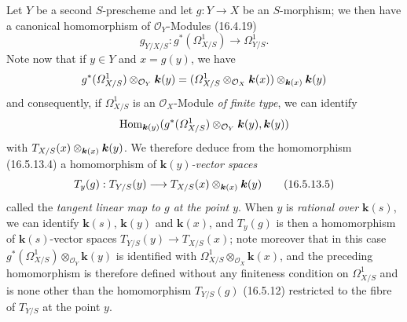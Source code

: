 \begin{env}[16.5.13]
Let $Y$ be a second $S$-prescheme and let $g:Y\to X$ be an $S$-morphism; we
then have a canonical homomorphism of $\mathcal{O}_Y$-Modules (16.4.19)
\[
  g_{Y/X/S}:g^*(\varOmega_{X/S}^1)\longrightarrow\varOmega_{Y/S}^1.
  \tag{16.5.13.4}
  \label{IV.16.5.13.4}
\]
Note now that if $y\in Y$ and $x=g(y)$, we have
\[
  g^*(\varOmega_{X/S}^1)\otimes_{\mathcal{O}_Y}\boldsymbol{k}(y)
  =(\varOmega_{X/S}^1\otimes_{\mathcal{O}_X}\boldsymbol{k}(x))
  \otimes_{\boldsymbol{k}(x)}\boldsymbol{k}(y)
\]
and consequently, if $\varOmega_{X/S}^1$ is an $\mathcal{O}_X$-Module
\emph{of finite type}, we can identify
\[
  \operatorname{Hom}_{\boldsymbol{k}(y)}
  (g^*(\varOmega_{X/S}^1)\otimes_{\mathcal{O}_Y}\boldsymbol{k}(y),\boldsymbol{k}(y))
\]
with $T_{X/S}(x)\otimes_{\boldsymbol{k}(x)}\boldsymbol{k}(y)$. We therefore deduce from the homomorphism
(16.5.13.4) a homomorphism of \emph{$\boldsymbol{k}(y)$-vector spaces}
\[
  T_y(g):T_{Y/S}(y)\longrightarrow
  T_{X/S}(x)\otimes_{\boldsymbol{k}(x)}\boldsymbol{k}(y)
  \tag{16.5.13.5}
  \label{IV.16.5.13.5}
\]
called the \emph{tangent linear map to $g$ at the point $y$}. When $y$ is
\emph{rational over $\boldsymbol{k}(s)$}, we can identify $\boldsymbol{k}(s)$, $\boldsymbol{k}(y)$ and $\boldsymbol{k}(x)$, and
$T_y(g)$ is then a homomorphism of $\boldsymbol{k}(s)$-vector spaces
$T_{Y/S}(y)\to T_{X/S}(x)$; note moreover that in this case
$g^*(\varOmega_{X/S}^1)\otimes_{\mathcal{O}_Y}\boldsymbol{k}(y)$ is identified with
$\varOmega_{X/S}^1\otimes_{\mathcal{O}_X}\boldsymbol{k}(x)$, and the preceding homomorphism is
therefore defined without any finiteness condition on $\varOmega_{X/S}^1$ and is
none other than the homomorphism $T_{Y/S}(g)$ (16.5.12) restricted to the fibre
of $T_{Y/S}$ at the point $y$.
\end{env}

